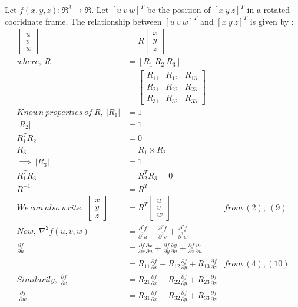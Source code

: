 \documentclass[a4paper,fleqn,11pt]{article}
\theoremstyle{mytheor}
\begin{document}
Let $f(x, y, z) : \Re^3 \rightarrow \Re$. Let $[u\ v\ w]^T$ be the position of $[x\ y\ z]^T$ in a rotated cooridnate frame.
The relationship between $[u\ v\ w]^T$ and $[x\ y\ z]^T$ is given by :
\begin{align}
\begin{bmatrix}
	u \\
	v \\
	w
\end{bmatrix} & =
	R
\begin{bmatrix}
	x \\
	y \\
	z
\end{bmatrix} \\
where,\ R & = [R_1\ R_2\ R_3] \\
& = \begin{bmatrix}
		R_{11} & R_{12} & R_{13} \\
		R_{21} & R_{22} & R_{23} \\
		R_{31} & R_{32} & R_{33}
	\end{bmatrix} \\
Known\ properties\ of\ R,\ |R_1| & = 1 \\
|R_2| & = 1 \\
R_1^T R_2 & = 0 \\
R_3  & = R_1 \times R_2 \\
\implies\ |R_3| & = 1 \\
R_1^T R_3 & = R_2^T R_3 = 0 \\
R^{-1} & = R^T \\
We\ can\ also\ write,\
\begin{bmatrix}
	x \\
	y \\
	z
\end{bmatrix} & =
	R^T
\begin{bmatrix}
	u \\
	v \\
	w
\end{bmatrix} & from\ (2),\ (9) \\
Now,\ \nabla^2 f(u, v, w) & = \frac{\partial^2 f}{\partial^2 u} +
							  \frac{\partial^2 f}{\partial^2 v} +
						      \frac{\partial^2 f}{\partial^2 w} \\
\frac{\partial f}{\partial u} & =
\frac{\partial f}{\partial x}\frac{\partial x}{\partial u} +
\frac{\partial f}{\partial y}\frac{\partial y}{\partial u} +
\frac{\partial f}{\partial z}\frac{\partial z}{\partial u} \\
& = R_{11}\frac{\partial f}{\partial x} +
	R_{12}\frac{\partial f}{\partial y} +
	R_{13}\frac{\partial f}{\partial z} & from\ (4), (10) \\
Similarily,\ \frac{\partial f}{\partial v}
& = R_{21}\frac{\partial f}{\partial x} +
	R_{22}\frac{\partial f}{\partial y} +
	R_{23}\frac{\partial f}{\partial z}\\
\ \frac{\partial f}{\partial w}
& = R_{31}\frac{\partial f}{\partial x} +
	R_{32}\frac{\partial f}{\partial y} +
	R_{33}\frac{\partial f}{\partial z}
\end{align}
\end{document}
